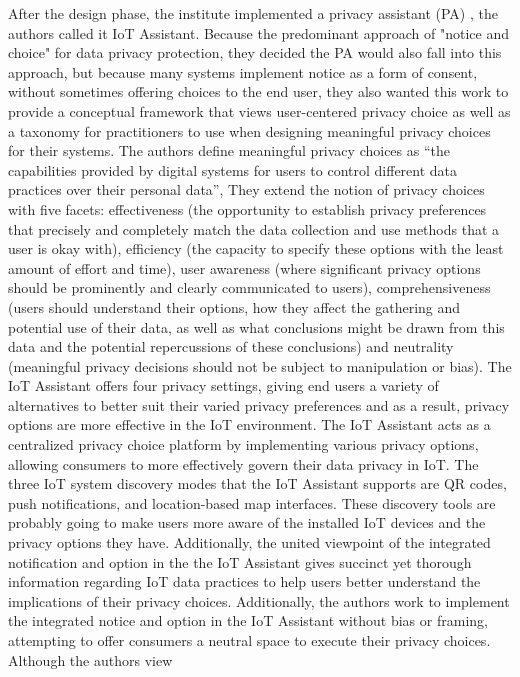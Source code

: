 \documentclass[conference]{IEEEtran}
\begin{document}
After the design phase, the institute implemented a privacy assistant (PA) \cite{FengDesign},
the authors called it IoT Assistant. Because the predominant approach of
"notice and choice" for data privacy protection, they decided the PA would
also fall into this approach, but because many systems implement notice
as a form of consent, without sometimes offering choices to the end user,
they also wanted this work to provide a conceptual framework that views
user-centered privacy choice as well as a taxonomy for practitioners to
use when designing meaningful privacy choices for their systems. The authors
define meaningful privacy choices as ``the capabilities provided by digital
systems for users to control different data practices over their personal
data'', They extend the notion of privacy choices with five facets: effectiveness
(the opportunity to establish privacy preferences that precisely and completely
match the data collection and use methods that a user is okay with), efficiency
(the capacity to specify these options with the least amount of effort and
time), user awareness (where significant privacy options should be prominently
and clearly communicated to users), comprehensiveness (users should understand
their options, how they affect the gathering and potential use of their
data, as well as what conclusions might be drawn from this data and the
potential repercussions of these conclusions) and neutrality (meaningful
privacy decisions should not be subject to manipulation or bias). The IoT
Assistant offers four privacy settings, giving end users a variety of alternatives
to better suit their varied privacy preferences and as a result, privacy
options are more effective in the IoT environment. The IoT Assistant acts
as a centralized privacy choice platform by implementing various privacy
options, allowing consumers to more effectively govern their data privacy
in IoT. The three IoT system discovery modes that the IoT Assistant supports
are QR codes, push notifications, and location-based map interfaces. These
discovery tools are probably going to make users more aware of the installed
IoT devices and the privacy options they have. Additionally, the united
viewpoint of the integrated notification and option in the the IoT Assistant
gives succinct yet thorough information regarding IoT data practices to
help users better understand the implications of their privacy choices.
Additionally, the authors work to implement the integrated notice and option
in the IoT Assistant without bias or framing, attempting to offer consumers
a neutral space to execute their privacy choices. Although the authors view
\end{document}

